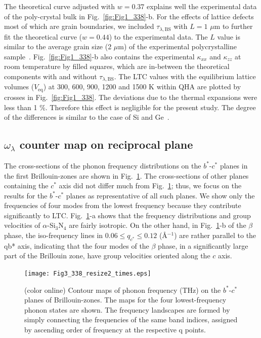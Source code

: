 \documentclass[twocolumn,amsmath,amssymb,a4paper,prb,superscriptaddress,floatfix]{revtex4-1}
\begin{document}
The theoretical curve adjusted with $w=0.37$ explains well the experimental
data of the poly-crystal bulk in Fig.~\ref{fig:Fig1_338}-b.  For the effects of
lattice defects most of which are grain boundaries, we included
$\tau_{\lambda,\text{BS}}$ with $L = 1$ $\mu\text{m}$ to further fit the
theoretical curve ($w=0.44$) to the experimental data.  The $L$ value is
similar to the average grain size (2 $\mu\text{m}$) of the experimental
polycrystalline sample~\cite{hirosaki}. 
Fig.~\ref{fig:Fig1_338}-b also contains the experimental $\kappa$$_{xx}$ and
$\kappa$$_{zz}$ at room temperature by filled squares, which are in-between the
theoretical components with and without $\tau_{\lambda,\text{BS}}$.
The LTC values with the equilibrium lattice volumes ($V_\text{eq}$) at 300,
600, 900, 1200 and 1500 K within QHA are plotted by crosses in
Fig.~\ref{fig:Fig1_338}.  The deviations due to the thermal expansions were
less than 1 \%. Therefore this effect is negligible for the present study.  The
degree of the differences is similar to the case of Si and Ge~\cite{ward-ltc}.

\subsection{$\omega_\lambda$ counter map on reciprocal plane}
The cross-sections of the phonon frequency distributions on the $b^*$-$c^*$
planes in the first Brillouin-zones are shown in Fig.~\ref{fig:Fig3_338}. 
The cross-sections of other planes containing the $c^*$ axis did not differ
much from Fig.~\ref{fig:Fig3_338}; thus, we focus on the results for the
$b^*$-$c^*$ planes as representative of all such planes. We show only the
frequencies of four modes from the lowest frequency because they contribute
significantly to LTC.
Fig.~\ref{fig:Fig3_338}-a shows that the frequency distributions and group
velocities of $\alpha$-Si$_3$N$_4$ are fairly isotropic. 
On the other hand, in Fig.~\ref{fig:Fig3_338}-b of the $\beta$ phase, the
iso-frequency lines in $0.06 \le q_{c^*} \le 0.12$ (\AA$^{-1}$) are rather
parallel to the qb* axis, indicating that the four modes of the $\beta$ phase,
in a significantly large part of the Brillouin zone, have group velocities
oriented along the $c$ axis.

\begin{figure}[ht]
 \begin{center}
  \texttt{[image: Fig3\_338\_resize2\_times.eps]} \caption{(color
  online) Contour maps of phonon frequency (THz) on the $b^*$-$c^*$
  planes of Brillouin-zones. The maps for the four lowest-frequency
  phonon states are shown. The frequency landscapes are formed by simply
  connecting the frequencies of the same band indices, assigned by
  ascending order of frequency at the respective q
  points. \label{fig:Fig3_338} }
 \end{center}
\end{figure}
\end{document}
